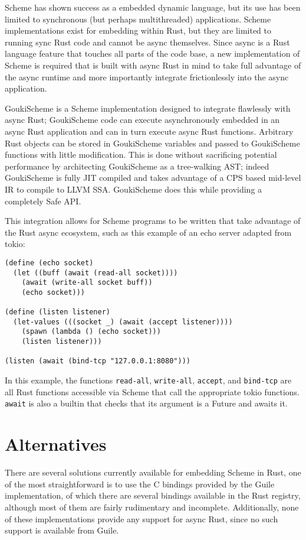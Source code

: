 \documentclass[sigplan,authordraft]{acmart}
\begin{document}
Scheme has shown success as a embedded dynamic language, but its use has been
limited to synchronous (but perhaps multithreaded) applications. Scheme
implementations exist for embedding within Rust, but they are limited to running
sync Rust code and cannot be async themselves. Since async is a Rust language
feature that touches all parts of the code base, a new implementation of Scheme
is required that is built with async Rust in mind to take full advantage of the
async runtime and more importantly integrate frictionlessly into the async
application.

GoukiScheme\cite{gouki} is a Scheme implementation designed to integrate
flawlessly with async Rust; GoukiScheme code can execute asynchronously embedded
in an async Rust application and can in turn execute async Rust functions. Arbitrary Rust
objects can be stored in GoukiScheme variables and passed to GoukiScheme
functions with little modification. This is done without sacrificing potential
performance by architecting GoukiScheme as a tree-walking AST; indeed GoukiScheme
is fully JIT compiled and takes advantage of a CPS based mid-level IR to compile
to LLVM SSA. GoukiScheme does this while providing a completely Safe API.

This integration allows for Scheme programs to be written that take advantage
of the Rust async ecosystem, such as this example of an echo server adapted
from tokio:

\begin{verbatim}
(define (echo socket)
  (let ((buff (await (read-all socket))))
    (await (write-all socket buff))
    (echo socket)))

(define (listen listener)
  (let-values (((socket _) (await (accept listener))))
    (spawn (lambda () (echo socket)))
    (listen listener)))

(listen (await (bind-tcp "127.0.0.1:8080")))
\end{verbatim}

In this example, the functions \texttt{read-all}, \texttt{write-all},
\texttt{accept}, and \texttt{bind-tcp} are all Rust functions accessible via
Scheme that call the appropriate tokio functions. \texttt{await} is also
a builtin that checks that its argument is a Future and awaits it.

\section{Alternatives}

There are several solutions currently available for embedding Scheme in Rust,
one of the most straightforward is to use the C bindings provided by the Guile
implementation, of which there are several bindings available in the Rust
registry, although most of them are fairly rudimentary and incomplete.
Additionally, none of these implementations provide any support for async Rust,
since no such support is available from Guile.
\end{document}
